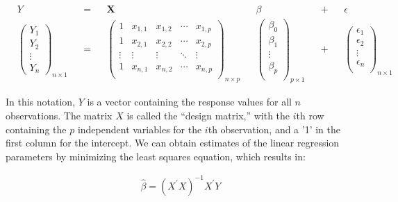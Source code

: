 \documentclass[10pt]{article}\usepackage[]{graphicx}\usepackage[]{xcolor}
\begin{document}
\begin{equation}\label{eq:lin-reg-mod}
    \begin{aligned}
        &Y& &=& &\mathbf{X}& &\beta& &+& &\epsilon&\\
        &\begin{pmatrix}
            Y_1\\
            Y_2\\
            \vdots\\
            Y_n
        \end{pmatrix}_{n \times 1}&
        &=&
        &\begin{pmatrix}
            1 & x_{1,1} & x_{1,2} & \cdots & x_{1,p}\\
            1 & x_{2,1} & x_{2,2} & \cdots & x_{2,p}\\
            \vdots & \vdots & \vdots & \ddots & \vdots\\
            1 & x_{n,1} & x_{n,2} & \cdots & x_{n,p}\\
        \end{pmatrix}_{n \times p}&
        &\begin{pmatrix}
            \beta_0\\
            \beta_1\\
            \vdots\\
            \beta_p\\
        \end{pmatrix}_{p \times 1}&
        &+&
        &\begin{pmatrix}
            \epsilon_1\\
            \epsilon_2\\
            \vdots\\
            \epsilon_n\\
        \end{pmatrix}_{n \times 1}&
    \end{aligned}
\end{equation}

In this notation, $Y$ is a vector containing the response values for all $n$ observations. The matrix $X$ is called the
``design matrix,'' with the $i$th row containing the $p$ independent variables for the $i$th observation, and a '1' in
the first column for the intercept. We can obtain estimates of the linear regression parameters by minimizing the least
squares equation, which results in:

\begin{equation*}
    \begin{aligned}
        \hat{\beta} = {\left( X^\prime X \right)}^{-1} X^\prime Y
    \end{aligned}
\end{equation*}
\end{document}
